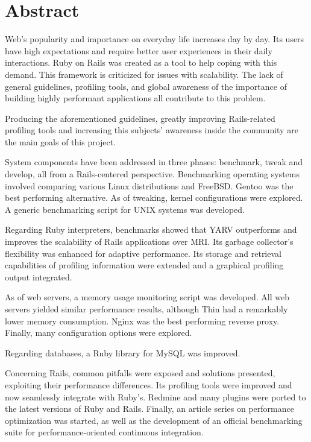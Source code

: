 
\chapter*{Abstract}
Web's popularity and importance on everyday life increases day by day. Its users have high expectations and require better user experiences in their daily interactions. Ruby on Rails was created as a tool to help coping with this demand. This framework is criticized for issues with scalability. The lack of general guidelines, profiling tools, and global awareness of the importance of building highly performant applications all contribute to this problem.

Producing the aforementioned guidelines, greatly improving Rails-related profiling tools and increasing this subjects' awareness inside the community are the main goals of this project.

System components have been addressed in three phases: benchmark, tweak and develop, all from a Rails-centered perspective. Benchmarking operating systems involved comparing various Linux distributions and FreeBSD. Gentoo was the best performing alternative. As of tweaking, kernel configurations were explored. A generic benchmarking script for UNIX systems was developed.

Regarding Ruby interpreters, benchmarks showed that YARV outperforms and improves the scalability of Rails applications over MRI. Its garbage collector's flexibility was enhanced for adaptive performance. Its storage and retrieval capabilities of profiling information were extended and a graphical profiling output integrated. 

As of web servers, a memory usage monitoring script was developed. All web servers yielded similar performance results, although Thin had a remarkably lower memory consumption. Nginx was the best performing reverse proxy. Finally, many configuration options were explored. 

Regarding databases, a Ruby library for MySQL was improved.

Concerning Rails, common pitfalls were exposed and solutions presented, exploiting their performance differences. Its profiling tools were improved and now seamlessly integrate with Ruby's. Redmine and many plugins were ported to the latest versions of Ruby and Rails. Finally, an article series on performance optimization was started, as well as the development of an official benchmarking suite for performance-oriented continuous integration.

